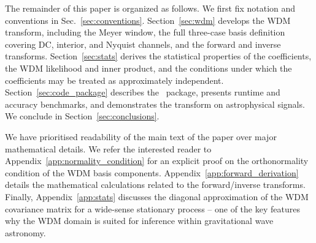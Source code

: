 \documentclass[twocolumn,preprintnumbers,
  superscriptaddress,
  nofootinbib,
  amsmath,
  amssymb,
  aps,
  prd,
  colorlinks=true,
  linkcolor=blue,
  urlcolor=blue,
  citecolor=blue,
  anchorcolor=blue
]{revtex4-2}
\begin{document}
The remainder of this paper is organized as follows. We first fix notation and conventions in Sec.~\ref{sec:conventions}. Section~\ref{sec:wdm} develops the WDM transform, including the Meyer window, the full three-case basis definition covering DC, interior, and Nyquist channels, and the forward and inverse transforms. Section~\ref{sec:stats} derives the statistical properties of the coefficients, the WDM likelihood and inner product, and the conditions under which the coefficients may be treated as approximately independent. Section~\ref{sec:code_package} describes the \package\ package, presents runtime and accuracy benchmarks, and demonstrates the transform on astrophysical signals. We conclude in Section~\ref{sec:conclusions}. 

We have prioritised readability of the main text of the paper over major mathematical details. We refer the interested reader to Appendix~\ref{app:normality_condition} for an explicit proof on the orthonormality condition of the WDM basis components. Appendix~\ref{app:forward_derivation} details the mathematical calculations related to the forward/inverse transforms. Finally, Appendix~\ref{app:stats} discusses the diagonal approximation of the WDM covariance matrix for a wide-sense stationary process -- one of the key features why the WDM domain is suited for inference within gravitational wave astronomy. 
\end{document}
